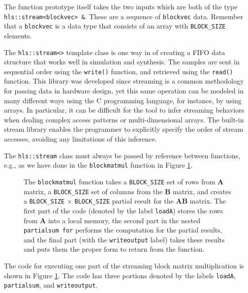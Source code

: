 The function prototype itself takes the two inputs which are both of the type \lstinline{hls::stream<blockvec> &}. These are a sequence of \lstinline{blockvec} data. Remember that a \lstinline{blockvec} is a data type that consists of an array with \lstinline{BLOCK_SIZE} elements. 

The \lstinline{hls::stream<>} template class is one way in \VHLS of creating a FIFO data structure that works well in simulation and synthesis. The samples are sent in sequential order using the \lstinline{write()} function, and retrieved using the \lstinline{read()} function. This library was developed since streaming is a common methodology for passing data in hardware design, yet this same operation can be modeled in many different ways using the C programming language, for instance, by using arrays. In particular, it can be difficult for the \VHLS tool to infer streaming behaviors when dealing complex access patterns or multi-dimensional arrays. The built-in stream library enables the programmer to explicitly specify the order of stream accesses, avoiding any limitations of this inference. 

\begin{aside}
The \lstinline{hls::stream} class must always be passed by reference between functions, e.g., as we have done in the \lstinline{blockmatmul} function in Figure \ref{fig:block_mm}.
\end{aside}

\begin{figure}
{\scriptsize }
\caption{  The \lstinline{blockmatmul} function takes a \lstinline{BLOCK_SIZE} set of rows from $\mathbf{A}$ matrix, a \lstinline{BLOCK_SIZE} set of columns from the $\mathbf{B}$ matrix, and creates a \lstinline{BLOCK_SIZE} $\times$ \lstinline{BLOCK_SIZE} partial result for the $\mathbf{AB}$ matrix. The first part of the code (denoted by the label \lstinline{loadA}) stores the rows from $\mathbf{A}$ into a local memory, the second part in the nested \lstinline{partialsum for} performs the computation for the partial results, and the final part (with the \lstinline{writeoutput} label) takes these results and puts them the proper form to return from the function.}
\label{fig:block_mm}
\end{figure}

The code for executing one part of the streaming block matrix multiplication is shown in Figure \ref{fig:block_mm}. The code has three portions denoted by the labels \lstinline{loadA}, \lstinline{partialsum}, and \lstinline{writeoutput}. 

